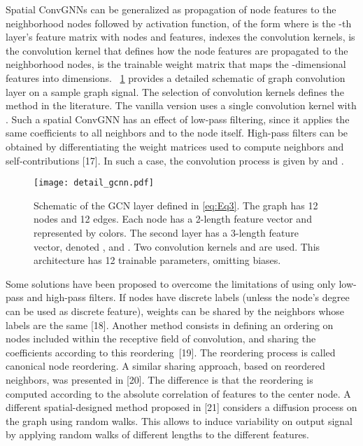 \documentclass{article}
\begin{document}
Spatial ConvGNNs can be generalized as propagation of node features to the neighborhood nodes followed by activation function, of the form 
where  is the -th layer's feature matrix with  nodes and  features,   indexes the convolution kernels,  is the convolution kernel that defines how the node features are propagated to the neighborhood nodes,  is the trainable weight matrix that maps the -dimensional features into  dimensions. \figurename~\ref{fig:detail_gcnn} provides a detailed schematic of graph convolution layer on a sample graph signal.
The selection of convolution kernels defines the method in the literature. The vanilla version uses a single convolution kernel with . Such a spatial ConvGNN has an effect of low-pass filtering, since it applies the same coefficients to all neighbors and to the node itself. High-pass filters can be obtained by differentiating the weight matrices used to compute neighbors and self-contributions [17]. In such a case, the convolution process is given by  and .  

\begin{figure}
  \centering
  \texttt{[image: detail\_gcnn.pdf]}
  \caption{Schematic of the GCN layer defined in \eqref{eq:Eq3}. The graph has 12 nodes and 12 edges. Each node has a 2-length feature vector  and  represented by colors. The second layer has a 3-length feature vector, denoted ,  and . Two convolution kernels  and  are used. This architecture has 12 trainable parameters, omitting biases.}
  \label{fig:detail_gcnn}
  \medskip
\end{figure}


Some solutions have been proposed to overcome the limitations of using only low-pass and high-pass filters. If nodes have discrete labels (unless the  node's degree can be used as discrete feature), weights can be shared by the neighbors whose labels are the same [18]. 
Another method consists in defining an ordering on nodes included within the receptive field of convolution, and sharing the coefficients according to this reordering~[19]. The reordering process is called canonical node reordering. A similar sharing approach, based on reordered neighbors, was presented in [20]. The difference is that the reordering is computed according to the absolute correlation of features to the center node. A different spatial-designed method proposed in [21] considers a diffusion process on the graph using random walks. This allows to induce variability on output signal by applying random walks of different lengths to the different features. 
\end{document}
